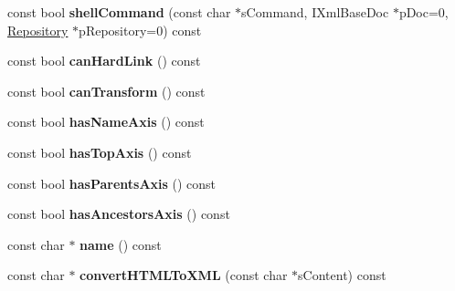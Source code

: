 \begin{DoxyCompactItemize}
\item 
\hypertarget{classgeneral__server_1_1LibXmlLibrary_aa7a6c2d7e7026919a50543195eb4f859}{const bool {\bfseries shell\-Command} (const char $\ast$s\-Command, \-I\-Xml\-Base\-Doc $\ast$p\-Doc=0, \hyperlink{classgeneral__server_1_1Repository}{\-Repository} $\ast$p\-Repository=0) const }\label{classgeneral__server_1_1LibXmlLibrary_aa7a6c2d7e7026919a50543195eb4f859}

\item 
\hypertarget{classgeneral__server_1_1LibXmlLibrary_ac2c779069d65d6555e39dddf82398ae5}{const bool {\bfseries can\-Hard\-Link} () const }\label{classgeneral__server_1_1LibXmlLibrary_ac2c779069d65d6555e39dddf82398ae5}

\item 
\hypertarget{classgeneral__server_1_1LibXmlLibrary_a590af1840f2da5124677dbbb08bbcfb2}{const bool {\bfseries can\-Transform} () const }\label{classgeneral__server_1_1LibXmlLibrary_a590af1840f2da5124677dbbb08bbcfb2}

\item 
\hypertarget{classgeneral__server_1_1LibXmlLibrary_aaaf971a9d0fe7ea4dd7312bff1c213ad}{const bool {\bfseries has\-Name\-Axis} () const }\label{classgeneral__server_1_1LibXmlLibrary_aaaf971a9d0fe7ea4dd7312bff1c213ad}

\item 
\hypertarget{classgeneral__server_1_1LibXmlLibrary_a64914e8e811c155ce5caa31a00cdba6a}{const bool {\bfseries has\-Top\-Axis} () const }\label{classgeneral__server_1_1LibXmlLibrary_a64914e8e811c155ce5caa31a00cdba6a}

\item 
\hypertarget{classgeneral__server_1_1LibXmlLibrary_a8251cf63309ad492649433464f709d07}{const bool {\bfseries has\-Parents\-Axis} () const }\label{classgeneral__server_1_1LibXmlLibrary_a8251cf63309ad492649433464f709d07}

\item 
\hypertarget{classgeneral__server_1_1LibXmlLibrary_a334e8610b20667b1f9378a6c2ba00f24}{const bool {\bfseries has\-Ancestors\-Axis} () const }\label{classgeneral__server_1_1LibXmlLibrary_a334e8610b20667b1f9378a6c2ba00f24}

\item 
\hypertarget{classgeneral__server_1_1LibXmlLibrary_a93c84e9275b7c670e90f9a305545be85}{const char $\ast$ {\bfseries name} () const }\label{classgeneral__server_1_1LibXmlLibrary_a93c84e9275b7c670e90f9a305545be85}

\item 
\hypertarget{classgeneral__server_1_1LibXmlLibrary_a5cc3f487c000dc7881045817256f21b6}{const char $\ast$ {\bfseries convert\-H\-T\-M\-L\-To\-X\-M\-L} (const char $\ast$s\-Content) const }\label{classgeneral__server_1_1LibXmlLibrary_a5cc3f487c000dc7881045817256f21b6}


\end{DoxyCompactItemize}
